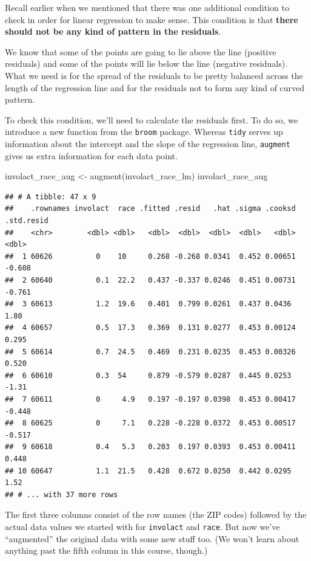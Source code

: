 \documentclass[
]{book}
\newenvironment{Shaded}{\begin{snugshade}}{\end{snugshade}}
\newcommand{\FunctionTok}[1]{\textcolor[rgb]{0.00,0.00,0.00}{#1}}
\newcommand{\NormalTok}[1]{#1}
\newcommand{\OtherTok}[1]{\textcolor[rgb]{0.56,0.35,0.01}{#1}}
\begin{document}
Recall earlier when we mentioned that there was one additional condition to check in order for linear regression to make sense. This condition is that \textbf{there should not be any kind of pattern in the residuals}.

We know that some of the points are going to lie above the line (positive residuals) and some of the points will lie below the line (negative residuals). What we need is for the spread of the residuals to be pretty balanced across the length of the regression line and for the residuals not to form any kind of curved pattern.

To check this condition, we'll need to calculate the residuals first. To do so, we introduce a new function from the \texttt{broom} package. Whereas \texttt{tidy} serves up information about the intercept and the slope of the regression line, \texttt{augment} gives us extra information for each data point.

\begin{Shaded}
\begin{Highlighting}[]
\NormalTok{involact\_race\_aug }\OtherTok{\textless{}{-}} \FunctionTok{augment}\NormalTok{(involact\_race\_lm)}
\NormalTok{involact\_race\_aug}
\end{Highlighting}
\end{Shaded}

\begin{verbatim}
## # A tibble: 47 x 9
##    .rownames involact  race .fitted .resid   .hat .sigma .cooksd .std.resid
##    <chr>        <dbl> <dbl>   <dbl>  <dbl>  <dbl>  <dbl>   <dbl>      <dbl>
##  1 60626          0    10     0.268 -0.268 0.0341  0.452 0.00651     -0.608
##  2 60640          0.1  22.2   0.437 -0.337 0.0246  0.451 0.00731     -0.761
##  3 60613          1.2  19.6   0.401  0.799 0.0261  0.437 0.0436       1.80 
##  4 60657          0.5  17.3   0.369  0.131 0.0277  0.453 0.00124      0.295
##  5 60614          0.7  24.5   0.469  0.231 0.0235  0.453 0.00326      0.520
##  6 60610          0.3  54     0.879 -0.579 0.0287  0.445 0.0253      -1.31 
##  7 60611          0     4.9   0.197 -0.197 0.0398  0.453 0.00417     -0.448
##  8 60625          0     7.1   0.228 -0.228 0.0372  0.453 0.00517     -0.517
##  9 60618          0.4   5.3   0.203  0.197 0.0393  0.453 0.00411      0.448
## 10 60647          1.1  21.5   0.428  0.672 0.0250  0.442 0.0295       1.52 
## # ... with 37 more rows
\end{verbatim}

The first three columns consist of the row names (the ZIP codes) followed by the actual data values we started with for \texttt{involact} and \texttt{race}. But now we've ``augmented'' the original data with some new stuff too. (We won't learn about anything past the fifth column in this course, though.)
\end{document}
